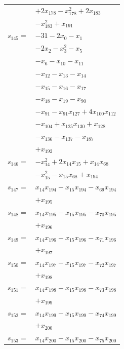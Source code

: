 \begin{longtable}{@{}r@{\;}l@{}}
 & \(\displaystyle +2x_{178} -x_{178}^{2} +2x_{183}\) \\
 & \(\displaystyle -x_{183}^{2} +x_{191}\) \\[3pt]
\(s_{145}=\) & \(\displaystyle -31 -2x_{0} -x_{1}\) \\
 & \(\displaystyle -2x_{2} -x_{3}^{2} -x_{5}\) \\
 & \(\displaystyle -x_{6} -x_{10} -x_{11}\) \\
 & \(\displaystyle -x_{12} -x_{13} -x_{14}\) \\
 & \(\displaystyle -x_{15} -x_{16} -x_{17}\) \\
 & \(\displaystyle -x_{18} -x_{19} -x_{90}\) \\
 & \(\displaystyle -x_{91} -x_{91}x_{127} +4x_{100}x_{112}\) \\
 & \(\displaystyle -x_{104} +x_{125}x_{130} +x_{128}\) \\
 & \(\displaystyle -x_{136} -x_{137} -x_{187}\) \\
 & \(\displaystyle +x_{192}\) \\[3pt]
\(s_{146}=\) & \(\displaystyle -x_{14}^{2} +2x_{14}x_{15} +x_{14}x_{68}\) \\
 & \(\displaystyle -x_{15}^{2} -x_{15}x_{68} +x_{194}\) \\[3pt]
\(s_{147}=\) & \(\displaystyle x_{14}x_{194} -x_{15}x_{194} -x_{69}x_{194}\) \\
 & \(\displaystyle +x_{195}\) \\[3pt]
\(s_{148}=\) & \(\displaystyle x_{14}x_{195} -x_{15}x_{195} -x_{70}x_{195}\) \\
 & \(\displaystyle +x_{196}\) \\[3pt]
\(s_{149}=\) & \(\displaystyle x_{14}x_{196} -x_{15}x_{196} -x_{71}x_{196}\) \\
 & \(\displaystyle +x_{197}\) \\[3pt]
\(s_{150}=\) & \(\displaystyle x_{14}x_{197} -x_{15}x_{197} -x_{72}x_{197}\) \\
 & \(\displaystyle +x_{198}\) \\[3pt]
\(s_{151}=\) & \(\displaystyle x_{14}x_{198} -x_{15}x_{198} -x_{73}x_{198}\) \\
 & \(\displaystyle +x_{199}\) \\[3pt]
\(s_{152}=\) & \(\displaystyle x_{14}x_{199} -x_{15}x_{199} -x_{74}x_{199}\) \\
 & \(\displaystyle +x_{200}\) \\[3pt]
\(s_{153}=\) & \(\displaystyle x_{14}x_{200} -x_{15}x_{200} -x_{75}x_{200}\) \\

\end{longtable}
